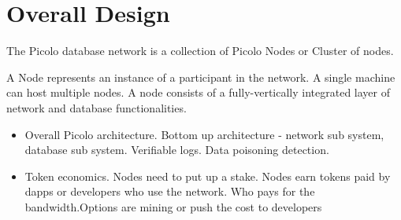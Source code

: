 \section{Overall Design}

The Picolo database network is a collection of Picolo Nodes or Cluster of nodes.

A Node represents an instance of a participant in the network. A single machine
can host multiple nodes. A node consists of a fully-vertically integrated layer of network and database functionalities.

    \begin{itemize}
        \item Overall Picolo architecture.
        	Bottom up architecture - network sub system, database sub system. Verifiable logs. Data poisoning detection.
        \item Token economics.
        	Nodes need to put up a stake. Nodes earn tokens paid by dapps or developers who use the network. Who pays for the bandwidth.Options are mining or push the cost to developers
    \end{itemize}


